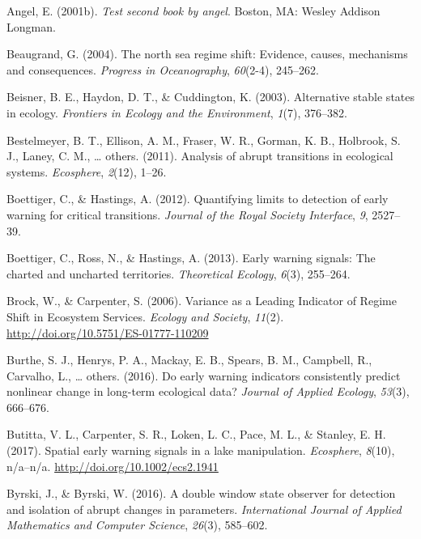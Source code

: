 \documentclass[12pt,twoside,openany]{reedthesis}
\begin{document}
\hypertarget{ref-angel2002a}{}
Angel, E. (2001b). \emph{Test second book by angel}. Boston, MA: Wesley
Addison Longman.

\hypertarget{ref-beaugrand2004north}{}
Beaugrand, G. (2004). The north sea regime shift: Evidence, causes,
mechanisms and consequences. \emph{Progress in Oceanography},
\emph{60}(2-4), 245--262.

\hypertarget{ref-beisner2003alternative}{}
Beisner, B. E., Haydon, D. T., \& Cuddington, K. (2003). Alternative
stable states in ecology. \emph{Frontiers in Ecology and the
Environment}, \emph{1}(7), 376--382.

\hypertarget{ref-bestelmeyer_analysis_2011}{}
Bestelmeyer, B. T., Ellison, A. M., Fraser, W. R., Gorman, K. B.,
Holbrook, S. J., Laney, C. M., \ldots{} others. (2011). Analysis of
abrupt transitions in ecological systems. \emph{Ecosphere},
\emph{2}(12), 1--26.

\hypertarget{ref-boettiger_quantifying_2012}{}
Boettiger, C., \& Hastings, A. (2012). Quantifying limits to detection
of early warning for critical transitions. \emph{Journal of the Royal
Society Interface}, \emph{9}, 2527--39.

\hypertarget{ref-boettiger_early_2013}{}
Boettiger, C., Ross, N., \& Hastings, A. (2013). Early warning signals:
The charted and uncharted territories. \emph{Theoretical Ecology},
\emph{6}(3), 255--264.

\hypertarget{ref-brock_variance_2006}{}
Brock, W., \& Carpenter, S. (2006). Variance as a Leading Indicator of
Regime Shift in Ecosystem Services. \emph{Ecology and Society},
\emph{11}(2). \url{http://doi.org/10.5751/ES-01777-110209}

\hypertarget{ref-burthe2016early}{}
Burthe, S. J., Henrys, P. A., Mackay, E. B., Spears, B. M., Campbell,
R., Carvalho, L., \ldots{} others. (2016). Do early warning indicators
consistently predict nonlinear change in long-term ecological data?
\emph{Journal of Applied Ecology}, \emph{53}(3), 666--676.

\hypertarget{ref-butitta_spatial_2017}{}
Butitta, V. L., Carpenter, S. R., Loken, L. C., Pace, M. L., \& Stanley,
E. H. (2017). Spatial early warning signals in a lake manipulation.
\emph{Ecosphere}, \emph{8}(10), n/a--n/a.
\url{http://doi.org/10.1002/ecs2.1941}

\hypertarget{ref-byrski2016double}{}
Byrski, J., \& Byrski, W. (2016). A double window state observer for
detection and isolation of abrupt changes in parameters.
\emph{International Journal of Applied Mathematics and Computer
Science}, \emph{26}(3), 585--602.
\end{document}
